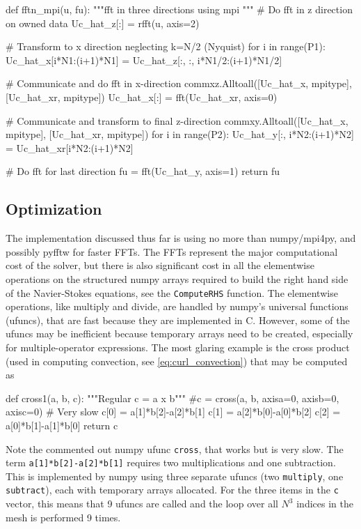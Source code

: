 \documentclass[11pt, oneside]{article}
\newcommand{\inpyth}{\lstinline[style=pythonstyle, basicstyle=\ttfamily]} %[]%
\begin{document}
\begin{python}
def fftn_mpi(u, fu):
    """fft in three directions using mpi
    """    
    # Do fft in z direction on owned data
    Uc_hat_z[:] = rfft(u, axis=2)
    
    # Transform to x direction neglecting k=N/2 (Nyquist)
    for i in range(P1):
        Uc_hat_x[i*N1:(i+1)*N1] = Uc_hat_z[:, :, i*N1/2:(i+1)*N1/2]
    
    # Communicate and do fft in x-direction
    commxz.Alltoall([Uc_hat_x, mpitype], [Uc_hat_xr, mpitype])
    Uc_hat_x[:] = fft(Uc_hat_xr, axis=0)        
    
    # Communicate and transform to final z-direction
    commxy.Alltoall([Uc_hat_x, mpitype], [Uc_hat_xr, mpitype])    
    for i in range(P2): 
        Uc_hat_y[:, i*N2:(i+1)*N2] = Uc_hat_xr[i*N2:(i+1)*N2]
                                   
    # Do fft for last direction 
    fu = fft(Uc_hat_y, axis=1)
    return fu
\end{python}

\subsection{Optimization}
The implementation discussed thus far is using no more than numpy/mpi4py, and possibly pyfftw for faster FFTs. The FFTs represent the major computational cost of the solver, but there is also significant cost in all the elementwise operations on the structured numpy arrays required to build the right hand side of the Navier-Stokes equations, see the \inpyth{ComputeRHS} function. The elementwise operations, like multiply and divide, are handled by numpy's universal functions (ufuncs), that are fast because they are implemented in C. However, some of the ufuncs may be inefficient because temporary arrays need to be created, especially for multiple-operator expressions. The most glaring example is the cross product (used in computing convection, see \ref{eq:curl_convection}) that may be computed as
\begin{python}
def cross1(a, b, c):
    """Regular c = a x b"""
    #c = cross(a, b, axisa=0, axisb=0, axisc=0) # Very slow
    c[0] = a[1]*b[2]-a[2]*b[1]
    c[1] = a[2]*b[0]-a[0]*b[2]
    c[2] = a[0]*b[1]-a[1]*b[0]
    return c
\end{python}
Note the commented out numpy ufunc \inpyth{cross}, that works but is very slow. The term \inpyth{a[1]*b[2]-a[2]*b[1]} requires two multiplications and one subtraction. This is implemented by numpy using three separate ufuncs (two \inpyth{multiply}, one \inpyth{subtract}), each with temporary arrays allocated. For the three items in the \inpyth{c} vector, this means that 9 ufuncs are called and the loop over all $N^3$ indices in the mesh is performed 9 times.
\end{document}
